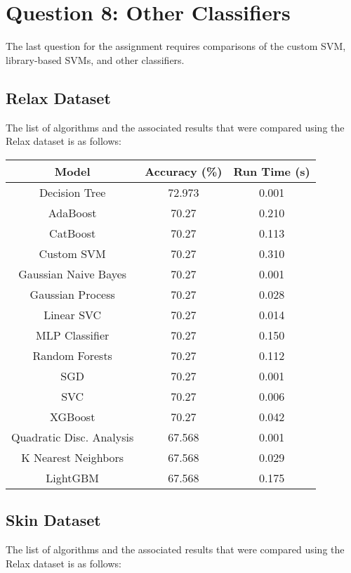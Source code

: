 \documentclass[letterpaper]{article}
\begin{document}
\section{Question 8: Other Classifiers}
The last question for the assignment requires comparisons of the custom SVM, library-based SVMs, and other classifiers.

\subsection{Relax Dataset}
The list of algorithms and the associated results that were compared using the Relax dataset is as follows:

\begin{center}
\begin{tabular}{|c c c|} 
 \hline
 Model & Accuracy (\%) & Run Time (s) \\
 \hline
 Decision Tree                   & 72.973 & 0.001 \\
 \hline
 AdaBoost                        & 70.27  & 0.210 \\
 \hline
 CatBoost                        & 70.27  & 0.113 \\
 \hline
 Custom SVM                      & 70.27  & 0.310 \\
 \hline
 Gaussian Naive Bayes            & 70.27  & 0.001 \\
 \hline
 Gaussian Process                & 70.27  & 0.028 \\
 \hline
 Linear SVC                      & 70.27  & 0.014 \\
 \hline
 MLP Classifier                  & 70.27  & 0.150 \\
 \hline
 Random Forests                  & 70.27  & 0.112 \\
 \hline
 SGD                             & 70.27  & 0.001 \\
 \hline
 SVC                             & 70.27  & 0.006 \\
 \hline
 XGBoost                         & 70.27  & 0.042 \\
 \hline
 Quadratic Disc. Analysis        & 67.568 & 0.001 \\
 \hline
 K Nearest Neighbors             & 67.568 & 0.029 \\
 \hline
 LightGBM                        & 67.568 & 0.175 \\
 \hline
\end{tabular}
\end{center}


\subsection{Skin Dataset}
The list of algorithms and the associated results that were compared using the Relax dataset is as follows:
\end{document}
